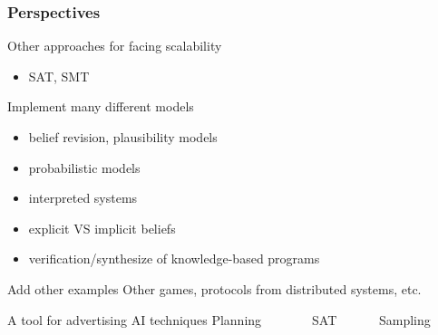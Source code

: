 



\begin{frame}
\frametitle{Perspectives}
\begin{block}{Other approaches for facing scalability}
	\begin{itemize}
		\item SAT, SMT
	\end{itemize}
\end{block}

\begin{block}{Implement many different models}
	\begin{itemize}
		\item belief revision, plausibility models
		\item probabilistic models
		\item interpreted systems
		\item explicit VS implicit beliefs
		\item verification/synthesize of knowledge-based programs
	\end{itemize}
\end{block}

\vfill

\begin{block}{Add other examples}
Other games, protocols from distributed systems, etc.
\end{block}

\vfill


\begin{block}{A tool for advertising AI techniques}
Planning~~~~~~~~SAT~~~~~~	Sampling
\end{block}
\end{frame}












